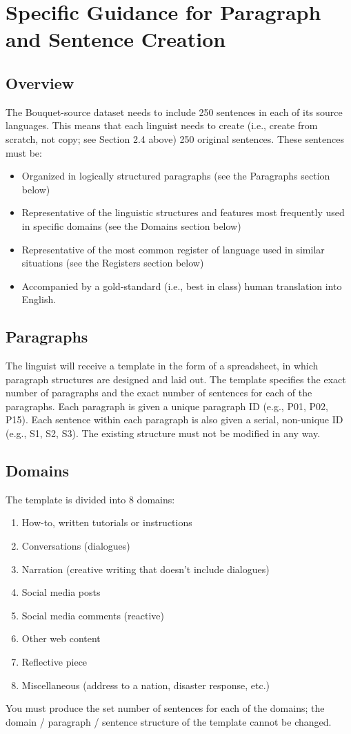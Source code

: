 \section{Specific Guidance for Paragraph and Sentence Creation}
\label{app:guidance}


\subsection{Overview}
The Bouquet-source dataset needs to include 250 sentences in each of its source languages. This means that each linguist needs to create (i.e., create from scratch, not copy; see Section 2.4 above) 250 original sentences. These sentences must be:
\begin{itemize}
\item Organized in logically structured paragraphs (see the Paragraphs section below)
\item Representative of the linguistic structures and features most frequently used in specific domains (see the Domains section below)
\item Representative of the most common register of language used in similar situations (see the Registers section below)
\item Accompanied by a gold-standard (i.e., best in class) human translation into English.%
\end{itemize}

\subsection{Paragraphs}
The linguist will receive a template in the form of a spreadsheet, in which paragraph structures are designed and laid out. The template specifies the exact number of paragraphs and the exact number of sentences for each of the paragraphs. Each paragraph is given a unique paragraph ID (e.g., P01, P02, P15). Each sentence within each paragraph is also given a serial, non-unique ID (e.g., S1, S2, S3). The existing structure must not be modified in any way.

\subsection{Domains}
The template is divided into 8 domains:
\begin{enumerate}
\item How-to, written tutorials or instructions
\item Conversations (dialogues)
\item Narration (creative writing that doesn't include dialogues)
\item Social media posts
\item Social media comments (reactive)
\item Other web content
\item Reflective piece
\item Miscellaneous (address to a nation, disaster response, etc.)
\end{enumerate}
You must produce the set number of sentences for each of the domains; the domain / paragraph / sentence structure of the template cannot be changed.

